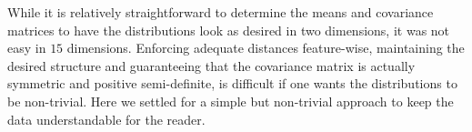 While it is relatively straightforward to determine the means and covariance matrices to have the distributions look as desired in two dimensions, 
it was not easy in $15$ dimensions. 
Enforcing adequate distances feature-wise, maintaining the desired structure and guaranteeing that the covariance matrix is actually symmetric and positive semi-definite,
is difficult if one wants the distributions to be non-trivial. 
Here we settled for a simple but non-trivial approach to keep the data understandable for the reader.
















